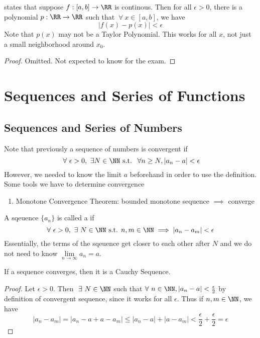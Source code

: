 \documentclass[12pt]{scrartcl}
\begin{document}
\begin{theorem}
   states that suppose $f: [a,b] \to \RR$ is continous. Then for all $\epsilon > 0$, 
  there is a polynomial $p: \RR \to \RR$ such that $\ \forall \ x \in [a,b]$, we have 
  \[|f(x) - p(x)| < \epsilon\]
  Note that $p(x)$ may not be a Taylor Polynomial. This works for all $x$, 
  not just a small neighborhood around $x_0$. 
  \begin{proof}
    Omitted. Not expected to know for the exam.
  \end{proof}
\end{theorem}

\section{Sequences and Series of Functions}

\subsection{Sequences and Series of Numbers}

\begin{note}
  Note that previously a sequence of numbers is convergent if 
  \[\ \forall \ \epsilon > 0, \ \exists N \in \NN \text{ s.t. } \ \forall n \geq N, |a_n - a| < \epsilon\]
  However, we needed to know the limit $a$ beforehand in order to use the definition.
  Some tools we have to determine convergence 
  \begin{enumerate}
    \item Monotone Convergence Theorem: bounded monotone sequence $\implies$ converge
  \end{enumerate}
\end{note}

\begin{definition}
  A sqeuence $\{a_n\}$ is called a  if 
  \[\forall \ \epsilon > 0, \ \exists \ N \in \NN \text{ s.t. } n, m \in \NN \implies |a_n - a_m| < \epsilon\]
  Essentially, the terms of the sqeuence get closer to each other after $N$ and we do not need to know $\underset{n\to\infty}{\lim}a_n = a$.
\end{definition}

\begin{theorem}
  If a sequence converges, then it is a Cauchy Sequence. 

  \begin{proof}
    Let $\epsilon > 0$. Then $\ \exists \ N \in \NN$ such that $\forall \ n \in \NN, |a_n - a| < \frac{\epsilon}{2}$
    by definition of convergent sequence, since it works for all $\epsilon$. Thus if $n, m \in \NN$, we have 
    \[|a_n - a_m| = |a_n - a + a - a_m| \leq |a_n - a| + |a - a_m| < \frac{\epsilon}{2} + \frac{\epsilon}{2} = \epsilon\]
  \end{proof}
\end{theorem}
\end{document}
